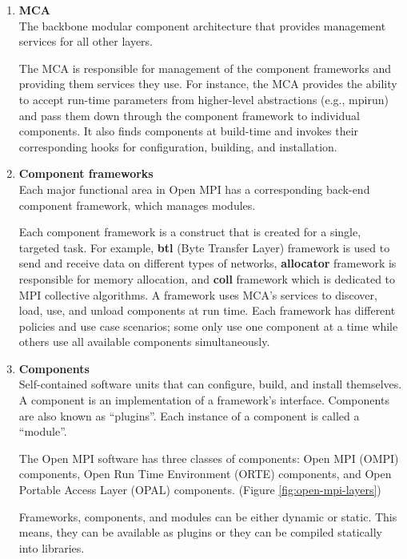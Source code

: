 \begin{enumerate}
\item \textbf {MCA}\\
  The backbone modular component architecture that provides management services for all other layers.
  
  The MCA is responsible for management of the component frameworks and providing them services they use. For instance, the MCA provides the ability to accept run-time parameters from higher-level abstractions (e.g., mpirun) and pass them down through the component framework to individual components. It also finds components at build-time and invokes their corresponding hooks for configuration, building, and installation.
  
\item \textbf{Component frameworks}\\
  Each major functional area in Open MPI has a corresponding back-end component framework, which manages modules.
  
  Each component framework is a construct that is created for a single, targeted task. For example, \textbf{btl} (Byte Transfer Layer) framework is used to send and receive data on different types of networks, \textbf{allocator} framework is responsible for memory allocation, and \textbf{coll} framework which is dedicated to MPI collective algorithms. A framework uses MCA's services to discover, load, use, and unload components at run time. Each framework has different policies and use case scenarios; some only use one component at a time while others use all available components simultaneously.

\item \textbf {Components}\\
  Self-contained software units that can configure, build, and install themselves. A component is an implementation of a framework's interface. Components are also known as ``plugins''. Each instance of a component is called a ``module''. 

  The Open MPI software has three classes of components: Open MPI (OMPI) components, Open Run Time Environment (ORTE) components, and Open Portable Access Layer (OPAL) components. (Figure \ref{fig:open-mpi-layers})

  Frameworks, components, and modules can be either dynamic or static. This means, they can be available as plugins or they can be compiled statically into libraries.
\end{enumerate}

